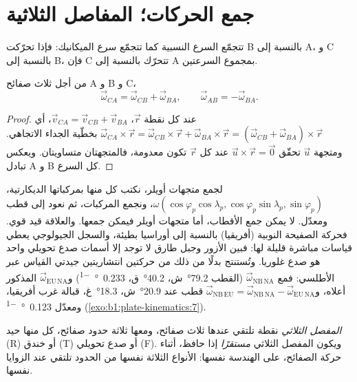 \section{جمع الحركات؛ المفاصل الثلاثية}

تتجمّع السرع النسبية كما تتجمّع سرع الميكانيك: فإذا تحرّكت B بالنسبة إلى A، و C بالنسبة إلى B، فإن C تتحرّك بالنسبة إلى A بمجموع السرعتين.

\begin{proposition}\label{prop:b1:plate-kinematics:addition}
من أجل ثلاث صفائح A و B و C،
\[
  \vec\omega_{CA} = \vec\omega_{CB} + \vec\omega_{BA}, \qquad
  \vec\omega_{AB} = -\vec\omega_{BA}.
\]
\end{proposition}

\begin{proof}
عند كل نقطة $\vec r$، $\vec v_{CA} = \vec v_{CB} + \vec v_{BA}$، أي
$\vec\omega_{CA}\times\vec r = \vec\omega_{CB}\times\vec r +
\vec\omega_{BA}\times\vec r = (\vec\omega_{CB} + \vec\omega_{BA})\times\vec r$ بخطّية الجداء الاتجاهي. ومتجهة $\vec u$ تحقّق $\vec u\times\vec r = \vec 0$ عند كل $\vec r$ تكون معدومة، فالمتجهتان متساويتان. ويعكس تبادل A و B كل السرع.
\end{proof}

لجمع متجهات أويلر، نكتب كل منها بمركباتها الديكارتية، $\omega(\cos\varphi_p
\cos\lambda_p, \cos\varphi_p\sin\lambda_p, \sin\varphi_p)$، ونجمع المركبات، ثم نعود إلى قطب ومعدّل. لا يمكن جمع الأقطاب، أما متجهات أويلر فيمكن جمعها. والعلاقة قيد قوي. فحركة الصفيحة النوبية (أفريقيا) بالنسبة إلى أوراسيا بطيئة، والسجل الجيولوجي يعطي قياسات مباشرة قليلة لها: فبين الأزور وجبل طارق لا توجد إلا أسمات صدع تحويلي واحد هو صدع غلوريا. وتُستنتج بدلًا من ذلك من حركتين انتشاريتين جيدتي القياس عبر الأطلسي: فمع $\vec\omega_{\mathrm{NB\,NA}}$ (القطب
\ang{79.2}~ش، \ang{40.2}~ق، \qty{0.233}{\degree\per\Myr}) و$\vec\omega_{\mathrm{EU\,NA}}$ المذكور أعلاه، و$\vec\omega_{\mathrm{NB\,EU}} =
\vec\omega_{\mathrm{NB\,NA}} - \vec\omega_{\mathrm{EU\,NA}}$ قطب عند
\ang{20.9}~ش، \ang{18.3}~غ، قبالة غرب أفريقيا، ومعدّل
\qty{0.123}{\degree\per\Myr} (\cref{exo:b1:plate-kinematics:7}).

\begin{definition}\label{def:b1:plate-kinematics:triple-junction}
\emph{المفصل الثلاثي} نقطة تلتقي عندها ثلاث صفائح، ومعها ثلاثة حدود صفائح، كل منها حيد (R) أو خندق (T) أو صدع تحويلي (F). ويكون المفصل الثلاثي \emph{مستقرًا} إذا حافظ، أثناء حركة الصفائح، على الهندسة نفسها: الأنواع الثلاثة نفسها من الحدود تلتقي عند الزوايا نفسها.
\end{definition}


